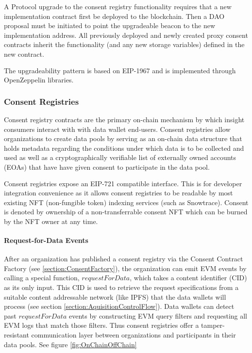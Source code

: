 A Protocol upgrade to the consent registry functionality requires that a new implementation contract first be deployed to the blockchain. Then a 
DAO proposal must be initiated to point the upgradeable beacon to the new implementation address. All previously deployed and newly created proxy 
consent contracts inherit the functionality (and any new storage variables) defined in the new contract.

The upgradeability pattern is based on EIP-1967 and is implemented through OpenZeppelin libraries.

\subsubsection{Consent Registries}
\label{section:ConsentContract}


Consent registry contracts are the primary on-chain mechanism by which insight consumers interact with with data wallet end-users. Consent 
registries allow organizations to create data pools by serving as an on-chain data structure that holds metadata regarding the conditions 
under which data is to be collected and used as well as a cryptographically verifiable list of externally owned accounts (EOAs) that have
have given consent to participate in the data pool. 

Consent registries expose an EIP-721 compatible interface. This is for developer integration convenience as it allows consent registries to 
be readable by most existing NFT (non-fungible token) indexing services (such as Snowtrace). Consent is denoted by ownership of a non-transferrable consent NFT 
 which can be burned by the NFT owner at any time. 

\paragraph{Request-for-Data Events}
\label{section:RequestForData}

After an organization has published a consent registry via the Consent Contract Factory (see \ref{section:ConsentFactory}), the organization can emit
EVM events by calling a special function, $requestForData$, which takes a content identifier (CID) as its only input. This CID is used to 
retrieve the request specifications from a suitable content addressable network (like IPFS) that the data wallets will process (see section \ref{section:AquisitionControlFlow}). Data wallets can detect 
past $requestForData$ events by constructing EVM query filters and requesting all EVM logs that match those filters. Thus consent registries offer a 
tamper-resistant communication layer between organizations and participants in their data pools. See figure \ref{fig:OnChainOffChain}

